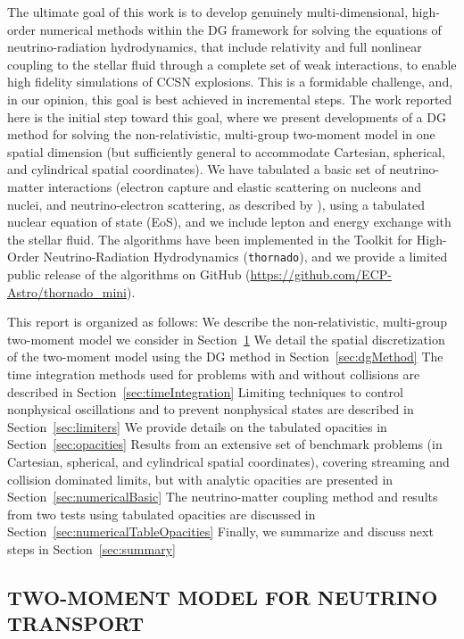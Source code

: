 \documentclass[11pt,letterpaper,twoside,english,final]{article}
\newcommand{\thornado}{\texttt{thornado}}
\begin{document}
The ultimate goal of this work is to develop genuinely multi-dimensional, high-order numerical methods within the DG framework for solving the equations of neutrino-radiation hydrodynamics, that include relativity and full nonlinear coupling to the stellar fluid through a complete set of weak interactions, to enable high fidelity simulations of CCSN explosions.  
This is a formidable challenge, and, in our opinion, this goal is best achieved in incremental steps.  
The work reported here is the initial step toward this goal, where we present developments of a DG method for solving the non-relativistic, multi-group two-moment model in one spatial dimension (but sufficiently general to accommodate Cartesian, spherical, and cylindrical spatial coordinates).  
We have tabulated a basic set of neutrino-matter interactions (electron capture and elastic scattering on nucleons and nuclei, and neutrino-electron scattering, as described by \citet{bruenn_1985}), using a tabulated nuclear equation of state (EoS), and we include lepton and energy exchange with the stellar fluid.  
The algorithms have been implemented in the Toolkit for High-Order Neutrino-Radiation Hydrodynamics (\thornado), and we provide a limited public release of the algorithms on GitHub (\url{https://github.com/ECP-Astro/thornado_mini}).  

This report is organized as follows:  
We describe the non-relativistic, multi-group two-moment model we consider in Section~\ref{sec:twoMomentModel}
We detail the spatial discretization of the two-moment model using the DG method in Section~\ref{sec:dgMethod}  
The time integration methods used for problems with and without collisions are described in Section~\ref{sec:timeIntegration}  
Limiting techniques to control nonphysical oscillations and to prevent nonphysical states are described in Section~\ref{sec:limiters}
We provide details on the tabulated opacities in Section~\ref{sec:opacities}  
Results from an extensive set of benchmark problems (in Cartesian, spherical, and cylindrical spatial coordinates), covering streaming and collision dominated limits, but with analytic opacities are presented in Section~\ref{sec:numericalBasic}  
The neutrino-matter coupling method and results from two tests using tabulated opacities are discussed in Section~\ref{sec:numericalTableOpacities} 
Finally, we summarize and discuss next steps in Section~\ref{sec:summary}  

\begin{center}
  \item\section{TWO-MOMENT MODEL FOR NEUTRINO TRANSPORT}
  \label{sec:twoMomentModel}
\end{center}
\end{document}
